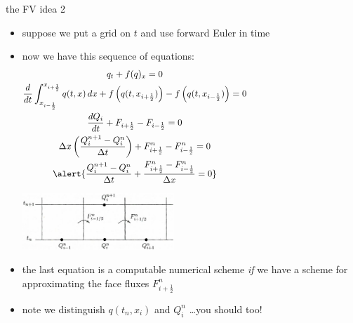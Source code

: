 \documentclass[10pt,hyperref]{beamer}
\newcommand{\xiphalf}{{x_{i+\frac{1}{2}}}}
\newcommand{\ximhalf}{{x_{i-\frac{1}{2}}}}
\newcommand{\Fiphalf}{{F_{i+\frac{1}{2}}}}
\newcommand{\Fimhalf}{{F_{i-\frac{1}{2}}}}
\newcommand{\Fiphalfn}{{F^n_{i+\frac{1}{2}}}}
\newcommand{\Fimhalfn}{{F^n_{i-\frac{1}{2}}}}
\begin{document}
\begin{frame}{the FV idea 2}

\begin{itemize}
\item suppose we put a grid on $t$ and use forward Euler in time
\item now we have this sequence of equations:
\small
\begin{gather*}
q_t + f(q)_x = 0 \hspace{50mm} \\
\frac{d}{dt} \int_\ximhalf^\xiphalf q(t,x) \,dx + f\left(q(t,\xiphalf)\right) - f\left(q(t,\ximhalf)\right) = 0 \hspace{50mm} \\
\frac{dQ_i}{dt} + \Fiphalf - \Fimhalf = 0 \hspace{50mm} \\
\Delta x \left(\frac{Q_i^{n+1} - Q_i^n}{\Delta t}\right) + \Fiphalfn - \Fimhalfn = 0 \hspace{50mm} \\
\alert{\frac{Q_i^{n+1} - Q_i^n}{\Delta t} + \frac{\Fiphalfn - \Fimhalfn}{\Delta x} = 0} \hspace{50mm}
\end{gather*}

\vspace{-15mm}

\hfill \includegraphics[width=0.45\textwidth]{figs/leveque4p1}

\normalsize
\medskip
\item the \alert{last equation} is a computable numerical scheme \emph{if} we have a scheme for approximating the face fluxes $\Fiphalfn$
\item note we distinguish $q(t_n,x_i)$ and $Q_i^n$ \quad \dots you should too!
\end{itemize}
\end{frame}
\end{document}
